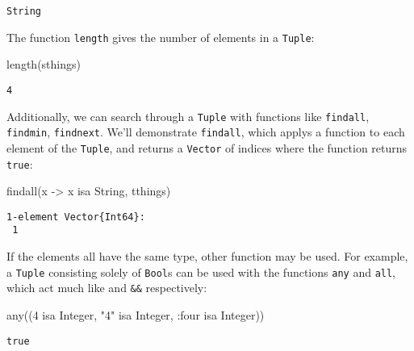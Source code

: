 \documentclass[
  letterpaper,
  DIV=11,
  numbers=noendperiod]{scrreprt}
\newenvironment{Shaded}{\begin{snugshade}}{\end{snugshade}}
\newcommand{\DataTypeTok}[1]{\textcolor[rgb]{0.68,0.00,0.00}{#1}}
\newcommand{\FloatTok}[1]{\textcolor[rgb]{0.68,0.00,0.00}{#1}}
\newcommand{\FunctionTok}[1]{\textcolor[rgb]{0.28,0.35,0.67}{#1}}
\newcommand{\NormalTok}[1]{\textcolor[rgb]{0.00,0.23,0.31}{#1}}
\newcommand{\OperatorTok}[1]{\textcolor[rgb]{0.37,0.37,0.37}{#1}}
\newcommand{\StringTok}[1]{\textcolor[rgb]{0.13,0.47,0.30}{#1}}
\begin{document}
\begin{verbatim}
String
\end{verbatim}

The function \texttt{length} gives the number of elements in a
\texttt{Tuple}:

\begin{Shaded}
\begin{Highlighting}[]
\FunctionTok{length}\NormalTok{(sthings)}
\end{Highlighting}
\end{Shaded}

\begin{verbatim}
4
\end{verbatim}

Additionally, we can search through a \texttt{Tuple} with functions like
\texttt{findall}, \texttt{findmin}, \texttt{findnext}. We'll demonstrate
\texttt{findall}, which applys a function to each element of the
\texttt{Tuple}, and returns a \texttt{Vector} of indices where the
function returns \texttt{true}:

\begin{Shaded}
\begin{Highlighting}[]
\FunctionTok{findall}\NormalTok{(x }\OperatorTok{{-}\textgreater{}}\NormalTok{ x isa }\DataTypeTok{String}\NormalTok{, tthings)}
\end{Highlighting}
\end{Shaded}

\begin{verbatim}
1-element Vector{Int64}:
 1
\end{verbatim}

If the elements all have the same type, other function may be used. For
example, a \texttt{Tuple} consisting solely of \texttt{Bool}s can be
used with the functions \texttt{any} and \texttt{all}, which act much
like \texttt{\textbar{}\textbar{}} and \texttt{\&\&} respectively:

\begin{Shaded}
\begin{Highlighting}[]
\FunctionTok{any}\NormalTok{((}\FloatTok{4}\NormalTok{ isa }\DataTypeTok{Integer}\NormalTok{, }\StringTok{"4"}\NormalTok{ isa }\DataTypeTok{Integer}\NormalTok{, }\OperatorTok{:}\NormalTok{four isa }\DataTypeTok{Integer}\NormalTok{))}
\end{Highlighting}
\end{Shaded}

\begin{verbatim}
true
\end{verbatim}
\end{document}
